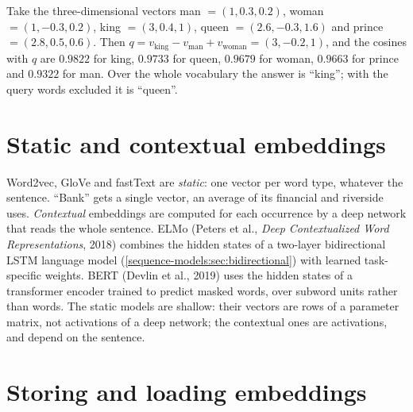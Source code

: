 \begin{notechapter}
\begin{example}\label{word-embeddings:ex:analogy}
Take the three-dimensional vectors man $= (1, 0.3, 0.2)$, woman $= (1, -0.3, 0.2)$, king $= (3, 0.4, 1)$,
queen $= (2.6, -0.3, 1.6)$ and prince $= (2.8, 0.5, 0.6)$. Then $q = v_{\text{king}} - v_{\text{man}} + v_{\text{woman}} = (3, -0.2, 1)$, and the cosines
with $q$ are $0.9822$ for king, $0.9733$ for queen, $0.9679$ for woman, $0.9663$ for prince and $0.9322$ for man. Over
the whole vocabulary the answer is ``king''; with the query words excluded it is ``queen''.
\end{example}

\section{Static and contextual embeddings}\label{word-embeddings:sec:contextual}

Word2vec, GloVe and fastText are \emph{static}: one vector per word type, whatever the sentence.
``Bank'' gets a single vector, an average of its financial and riverside uses. \emph{Contextual}
embeddings are computed for each occurrence by a deep network that reads the whole
sentence. ELMo (Peters et al., \emph{Deep Contextualized Word Representations}, 2018) combines
the hidden states of a two-layer bidirectional LSTM language model (\cref{sequence-models:sec:bidirectional})
with learned task-specific weights. BERT (Devlin et al., 2019) uses the hidden states of a
transformer encoder trained to predict masked words, over subword units rather than words.
The static models are shallow: their vectors are rows of a parameter matrix, not activations
of a deep network; the contextual ones are activations, and depend on the sentence.

\section{Storing and loading embeddings}\label{word-embeddings:sec:implementation}


\end{notechapter}
